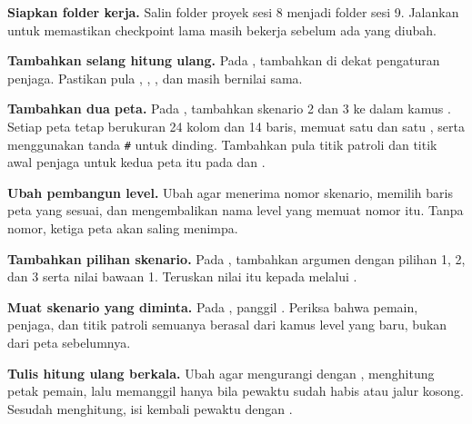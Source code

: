 \begin{langkah}
  \item \textbf{Siapkan folder kerja.} Salin folder proyek sesi 8 menjadi
        folder sesi 9. Jalankan  untuk
        memastikan checkpoint lama masih bekerja sebelum ada yang diubah.

  \item \textbf{Tambahkan selang hitung ulang.} Pada ,
        tambahkan  di dekat pengaturan penjaga.
        Pastikan pula , ,
        , dan
         masih bernilai sama.

  \item \textbf{Tambahkan dua peta.} Pada , tambahkan
        skenario 2 dan 3 ke dalam kamus . Setiap peta tetap
        berukuran 24 kolom dan 14 baris, memuat satu  dan satu
        , serta menggunakan tanda \texttt{\#} untuk dinding.
        Tambahkan pula titik patroli dan titik awal penjaga untuk kedua peta
        itu pada  dan .

  \item \textbf{Ubah pembangun level.} Ubah  agar menerima
        nomor skenario, memilih baris peta yang sesuai, dan mengembalikan
        nama level yang memuat nomor itu. Tanpa nomor, ketiga peta akan
        saling menimpa.

  \item \textbf{Tambahkan pilihan skenario.} Pada , tambahkan
        argumen  dengan pilihan 1, 2, dan 3 serta nilai
        bawaan 1. Teruskan nilai itu kepada  melalui
        .

  \item \textbf{Muat skenario yang diminta.} Pada ,
        panggil . Periksa bahwa
        pemain, penjaga, dan titik patroli semuanya berasal dari kamus level
        yang baru, bukan dari peta sebelumnya.

  \item \textbf{Tulis hitung ulang berkala.} Ubah  agar
        mengurangi  dengan , menghitung
        petak pemain, lalu memanggil  hanya bila pewaktu
        sudah habis atau jalur kosong. Sesudah menghitung, isi kembali
        pewaktu dengan .


\end{langkah}
